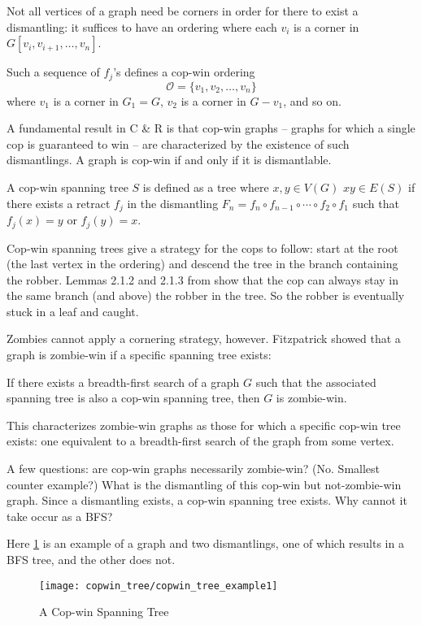 Not all vertices of a graph need be corners in order for there
to exist a dismantling: it suffices to have an ordering where each $v_i$ is a corner in
$G[v_i, v_{i+1}, \dots, v_n]$.

Such a sequence of $f_j$'s defines a cop-win ordering
\[ \mathcal{O} = \{ v_1, v_2, \dots, v_n\} \]
 where $v_1$ is a corner in $G_1 = G$, $v_2$ is a corner in $G - v_1$, and so on.

A fundamental result in C \& R is that cop-win graphs -- graphs for which a single
cop is guaranteed to win --  are characterized by the existence of such dismantlings.
A graph is cop-win if and only if it is dismantlable.

A cop-win spanning tree $S$ is defined as a tree where $x,y\in V(G)$
$xy \in E(S)$ if there exists a retract $f_j$ in the dismantling
$F_n = f_{n} \circ f_{n-1} \circ \cdots \circ f_{2} \circ f_1$
such that $f_j (x) = y$ or $f_j (y) = x$.

Cop-win spanning trees give a strategy for the cops to follow: start at the root
(the last vertex in the ordering) and descend the tree in the branch containing the robber.
Lemmas 2.1.2 and 2.1.3 from \cite{clarke2002constrained} show that the cop
can always stay in the same branch (and above) the robber in the tree. So the
robber is eventually stuck in a leaf and caught.

Zombies cannot apply a cornering strategy, however. Fitzpatrick showed that a
graph is zombie-win if a specific spanning tree exists:

\begin{theorem}[6. Fitzpatrick]
If there exists a breadth-first search of a graph $G$ such that the associated spanning tree is also a cop-win spanning tree, then $G$ is zombie-win.
\end{theorem}

This characterizes zombie-win graphs as those for which a specific cop-win tree exists: one equivalent
to a breadth-first search of the graph from some vertex.

A few questions: are cop-win graphs necessarily zombie-win? (No. Smallest counter example?)
What is the dismantling of this cop-win but not-zombie-win graph. Since a dismantling exists,
a cop-win spanning tree exists. Why cannot it take occur as a BFS?

Here \ref{fig:copwin_tree1} is an example of a graph and two dismantlings, one of which results in a BFS tree,
and the other does not.

\begin{figure}
\centering
\texttt{[image: copwin\_tree/copwin\_tree\_example1]}
\caption{A Cop-win Spanning Tree \label{fig:copwin_tree1}}
\end{figure}

